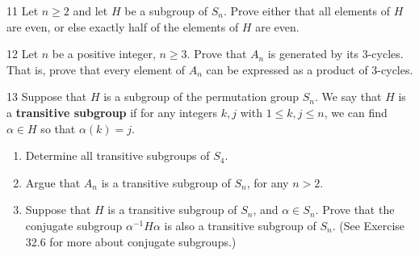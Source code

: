 \begin{problem}{11}
    Let $n \ge 2$ and let $H$ be a subgroup of $S_n$. Prove either that all elements of
    $H$ are even, or else exactly half of the elements of $H$ are even.
\end{problem}
\unsolved

\begin{problem}{12}
    Let $n$ be a positive integer, $n \ge 3$. Prove that $A_n$ is generated by its
    3-cycles. That is, prove that every element of $A_n$ can be expressed as a product of
    3-cycles.
\end{problem}
\unsolved

\begin{problem}{13}
    Suppose that $H$ is a subgroup of the permutation group $S_n$. We say that $H$ is a
    \textbf{transitive subgroup} if for any integers $k, j$ with $1 \le k, j \le n$, we can
    find $\alpha \in H$ so that $\alpha(k) = j$.
    \begin{enumerate}
        \item[(a)] Determine all transitive subgroups of $S_4$.
        \item[(b)] Argue that $A_n$ is a transitive subgroup of $S_n$, for any $n > 2$.
        \item[(c)] Suppose that $H$ is a transitive subgroup of $S_n$, and
        $\alpha \in S_n$. Prove that the conjugate subgroup $\alpha^{-1}H\alpha$ is also a
        transitive subgroup of $S_n$. (See Exercise 32.6 for more about conjugate
        subgroups.)
    \end{enumerate}
\end{problem}
\unsolved
